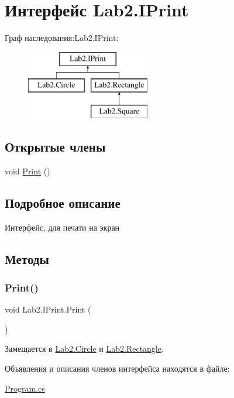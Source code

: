 \hypertarget{interface_lab2_1_1_i_print}{}\section{Интерфейс Lab2.\+I\+Print}
\label{interface_lab2_1_1_i_print}
Граф наследования\+:Lab2.\+I\+Print\+:\begin{figure}[H]
\begin{center}
\leavevmode
\includegraphics[height=3.000000cm]{interface_lab2_1_1_i_print}
\end{center}
\end{figure}
\subsection*{Открытые члены}
\begin{DoxyCompactItemize}
\item 
void \hyperlink{interface_lab2_1_1_i_print_ab2ab78a92b129513c12b26f473d65c31}{Print} ()
\end{DoxyCompactItemize}


\subsection{Подробное описание}
Интерфейс, для печати на экран 

\subsection{Методы}
\mbox{\label{interface_lab2_1_1_i_print_ab2ab78a92b129513c12b26f473d65c31}} 
\subsubsection{\texorpdfstring{Print()}{Print()}}
{\footnotesize\ttfamily void Lab2.\+I\+Print.\+Print (\begin{DoxyParamCaption}{ }\end{DoxyParamCaption})}



Замещается в \hyperlink{class_lab2_1_1_circle_a300cdfbc89e35dadfdcd35ff085ffc13}{Lab2.\+Circle} и \hyperlink{class_lab2_1_1_rectangle_a7bc8ce3f09ba299aba57045c396b6b4e}{Lab2.\+Rectangle}.



Объявления и описания членов интерфейса находятся в файле\+:\begin{DoxyCompactItemize}
\item 
\hyperlink{_program_8cs}{Program.\+cs}\end{DoxyCompactItemize}
